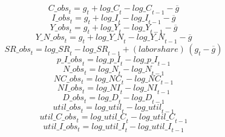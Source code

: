 \begin{dmath}
{C\_obs}_{t}={{g}}_{t}+{log\_C}_{t}-{log\_C}_{t-1}-{{\overline{g}}}
\end{dmath}
\begin{dmath}
{I\_obs}_{t}={{g}}_{t}+{log\_I}_{t}-{log\_I}_{t-1}-{{\overline{g}}}
\end{dmath}
\begin{dmath}
{Y\_obs}_{t}={{g}}_{t}+{log\_Y}_{t}-{log\_Y}_{t-1}-{{\overline{g}}}
\end{dmath}
\begin{dmath}
{Y\_N\_obs}_{t}={{g}}_{t}+{log\_Y\_N}_{t}-{log\_Y\_N}_{t-1}-{{\overline{g}}}
\end{dmath}
\begin{dmath}
{SR\_obs}_{t}={log\_SR}_{t}-{log\_SR}_{t-1}+{(labor share)}\, \left({{g}}_{t}-{{\overline{g}}}\right)
\end{dmath}
\begin{dmath}
{p\_I\_obs}_{t}={log\_p\_I}_{t}-{log\_p\_I}_{t-1}
\end{dmath}
\begin{dmath}
{N\_obs}_{t}={log\_N}_{t}-{log\_N}_{t-1}
\end{dmath}
\begin{dmath}
{NC\_obs}_{t}={log\_NC}_{t}-{log\_NC}_{t-1}
\end{dmath}
\begin{dmath}
{NI\_obs}_{t}={log\_NI}_{t}-{log\_NI}_{t-1}
\end{dmath}
\begin{dmath}
{D\_obs}_{t}={log\_D}_{t}-{log\_D}_{t-1}
\end{dmath}
\begin{dmath}
{util\_obs}_{t}={log\_util}_{t}-{log\_util}_{t-1}
\end{dmath}
\begin{dmath}
{util\_C\_obs}_{t}={log\_util\_C}_{t}-{log\_util\_C}_{t-1}
\end{dmath}
\begin{dmath}
{util\_I\_obs}_{t}={log\_util\_I}_{t}-{log\_util\_I}_{t-1}
\end{dmath}
